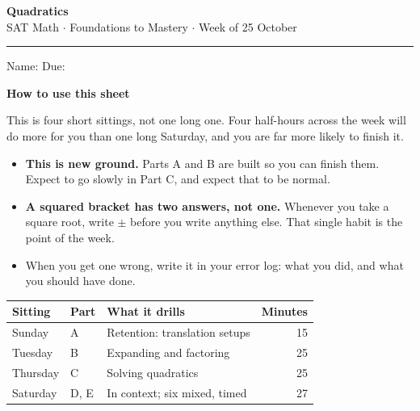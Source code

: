 \documentclass[11pt,a4paper]{article}
\newif\ifANSWERS
\begin{document}
\label{firstpage}

\begin{center}
{\LARGE\bfseries\color{navy}Quadratics}\\[4pt]
{\color{navy}SAT Math $\cdot$ Foundations to Mastery $\cdot$ Week of 25 October}
\ifANSWERS\\[4pt]{\color{keyred}\bfseries ANSWER KEY --- tutor copy}\fi
\end{center}
\vspace{2pt}
{\color{rule}\rule{\textwidth}{1pt}}
\vspace{6pt}

\ifANSWERS\else
Name: \underline{\hspace{6cm}} \hfill Due: \underline{\hspace{3.2cm}}
\vspace{6pt}
\fi

\begin{mdframed}[backgroundcolor=boxbg,linecolor=navy,linewidth=0.6pt,innertopmargin=6pt,innerbottommargin=8pt]
{\bfseries\color{navy}How to use this sheet}\par\vspace{2pt}
This is four short sittings, not one long one. Four half-hours across the week will
do more for you than one long Saturday, and you are far more likely to finish it.

\begin{itemize}[leftmargin=14pt,itemsep=1pt,topsep=3pt]
  \item \textbf{This is new ground.} Parts A and B are built so you can finish them. Expect to go slowly in Part C, and expect that to be normal.
  \item \textbf{A squared bracket has two answers, not one.} Whenever you take a square root, write $\pm$ before you write anything else. That single habit is the point of the week.
  \item When you get one wrong, write it in your error log: what you did, and what you should have done.
\end{itemize}
\end{mdframed}

\vspace{4pt}
\begin{center}
\begin{tabularx}{\textwidth}{@{}l l X r@{}}
\textbf{Sitting} & \textbf{Part} & \textbf{What it drills} & \textbf{Minutes}\\[2pt]
\hline\rule{0pt}{11pt}
Sunday   & A    & Retention: translation setups                 & 15\\
Tuesday  & B    & Expanding and factoring                       & 25\\
Thursday & C    & Solving quadratics                            & 25\\
Saturday & D, E & In context; six mixed, timed                  & 27\\
\hline
\end{tabularx}
\end{center}
\end{document}
